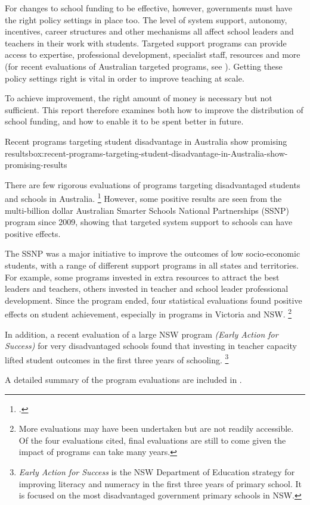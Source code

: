 \documentclass{grattan}
\begin{document}
For changes to school funding to be effective, however, governments must have the right policy settings in place too.
The level of system support, autonomy, incentives, career structures and other mechanisms all affect school leaders and teachers in their work with students. Targeted support programs can provide access to expertise, professional development, specialist staff, resources and more (for recent evaluations of Australian targeted programs, see ). Getting these policy settings right is vital in order to improve teaching at scale.


To achieve improvement, the right amount of money is necessary but not sufficient.
This report therefore examines both how to improve the distribution of school funding, and how to enable it to be spent better in future.

\begin{smallbox}{Recent programs targeting student disadvantage in Australia show promising results}{box:recent-programs-targeting-student-disadvantage-in-Australia-show-promising-results}

There are few rigorous evaluations of programs targeting disadvantaged students and schools in Australia.%
\footcite{Commission2012SchoolWorkforce} However, some positive results are seen from the multi-billion dollar Australian Smarter Schools National Partnerships (SSNP) program since 2009, showing that targeted system support to schools can have positive effects.

The SSNP was a major initiative to improve the outcomes of low socio-economic students, with a range of different support programs in all states and territories.
For example, some programs invested in extra resources to attract the best leaders and teachers, others invested in teacher and school leader professional development.
Since the program ended, four statistical evaluations found positive effects on student achievement, especially in programs in Victoria and NSW.%
\footnote{More evaluations may have been undertaken but are not readily accessible.
Of the four evaluations cited, final evaluations are still to come given the impact of programs can take many years.}

In addition, a recent evaluation of a large NSW program \emph{(Early Action for Success)} for very disadvantaged schools found that investing in teacher capacity lifted student outcomes in the first three years of schooling.%
\footnote{\emph{Early Action for Success} is the NSW Department of Education strategy for improving literacy and numeracy in the first three years of primary school.
It is focused on the most disadvantaged government primary schools in NSW.}

A detailed summary of the program evaluations are included in .
\end{smallbox}
\end{document}
